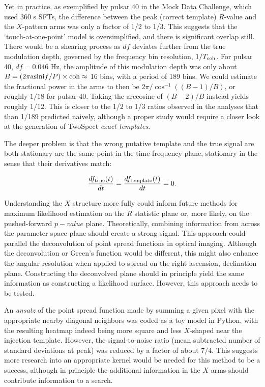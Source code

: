 Yet in practice, as exemplified by pulsar 40 in the Mock Data Challenge, which used 360 s SFTs, the difference between the peak (correct template) $R$-value and the $X$-pattern arms was only a factor of 1/2 to 1/3.
This suggests that the `touch-at-one-point' model is oversimplified, and there is significant overlap still.
There would be a shearing process as $df$ deviates further from the true modulation depth, governed by the frequency bin resolution, $1/T_\textup{coh}$. 
For pulsar 40, $df = 0.046$ Hz, the amplitude of this modulation depth was only about $B = \left(2 \pi \textup{asini} f / P \right) \times \textup{coh} \approx $ 16 bins, with a period of 189 bins.
We could estimate the fractional power in the arms to then be $2 \pi / \cos^{-1} ((B-1) / B)$, or roughly $1/18$ for pulsar 40.
Taking the arccosine of $(B-2)/B$ instead yields roughly $1/12$.
This is closer to the 1/2 to 1/3 ratios observed in the analyses that than 1/189 predicted naively, although a proper study would require a closer look at the generation of TwoSpect \textit{exact templates}.

The deeper problem is that the wrong putative template and the true signal are both stationary are the same point in the time-frequency plane, stationary in the sense that their derivatives match:

\begin{equation}
\frac{df_\textup{true} (t)}{dt} = \frac{df_\textup{template}(t)}{dt} = 0.
\end{equation}

Understanding the $X$ structure more fully could inform future methods for maximum likelihood estimation on the $R$ statistic plane or, more likely, on the pushed-forward $p-value$ plane.
Theoretically, combining information from across the parameter space plane should create a strong signal.
This approach could parallel the deconvolution of point spread functions in optical imaging.
Although the deconvolution or Green's function would be different, this might also enhance the angular resolution when applied to spread on the right ascension, declination plane.
Constructing the deconvolved plane should in principle yield the same information as constructing a likelihood surface.
However, this approach needs to be tested.

An \textit{ansatz} of the point spread function made by summing a given pixel with the appropriate nearby diagonal neighbors was coded as a toy model in Python, with the resulting heatmap indeed being more square and less $X$-shaped near the injection template. However, the signal-to-noise ratio (mean subtracted number of standard deviations at peak) was reduced by a factor of about $7/4$. This suggests more research into an appropriate kernel would be needed for this method to be a success, although in principle the additional information in the $X$ arms should contribute information to a search. 

